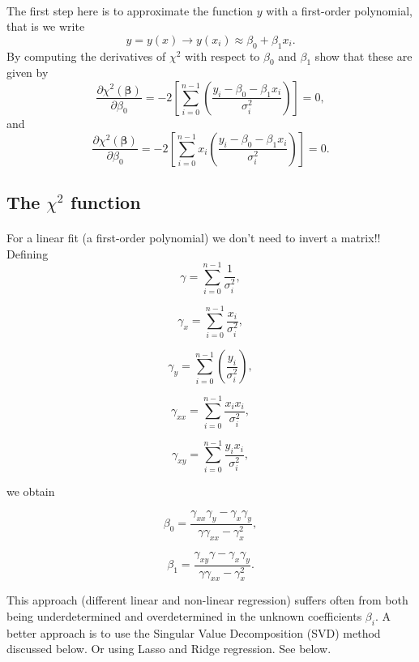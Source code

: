 \documentclass[%
oneside,                 %
final,                   %
10pt]{article}
\begin{document}
\paragraph{}
The first step here is to approximate the function $y$ with a first-order polynomial, that is we write
\[
y=y(x) \rightarrow y(x_i) \approx \beta_0+\beta_1 x_i.
\]
By computing the derivatives of $\chi^2$ with respect to $\beta_0$ and $\beta_1$ show that these are given by
\[
\frac{\partial \chi^2(\bm{\beta})}{\partial \beta_0} = -2\left[ \sum_{i=0}^{n-1}\left(\frac{y_i-\beta_0-\beta_1x_{i}}{\sigma_i^2}\right)\right]=0,
\]
and
\[
\frac{\partial \chi^2(\bm{\beta})}{\partial \beta_0} = -2\left[ \sum_{i=0}^{n-1}x_i\left(\frac{y_i-\beta_0-\beta_1x_{i}}{\sigma_i^2}\right)\right]=0.
\]



\subsection{The $\chi^2$ function}

\paragraph{}

For a linear fit (a first-order polynomial) we don't need to invert a matrix!!  
Defining
\[
\gamma =  \sum_{i=0}^{n-1}\frac{1}{\sigma_i^2},
\]

\[
\gamma_x =  \sum_{i=0}^{n-1}\frac{x_{i}}{\sigma_i^2},
\]

\[
\gamma_y = \sum_{i=0}^{n-1}\left(\frac{y_i}{\sigma_i^2}\right),
\]

\[
\gamma_{xx} =  \sum_{i=0}^{n-1}\frac{x_ix_{i}}{\sigma_i^2},
\]

\[
\gamma_{xy} = \sum_{i=0}^{n-1}\frac{y_ix_{i}}{\sigma_i^2},
\]

we obtain

\[
\beta_0 = \frac{\gamma_{xx}\gamma_y-\gamma_x\gamma_y}{\gamma\gamma_{xx}-\gamma_x^2},
\]

\[
\beta_1 = \frac{\gamma_{xy}\gamma-\gamma_x\gamma_y}{\gamma\gamma_{xx}-\gamma_x^2}.
\]

This approach (different linear and non-linear regression) suffers
often from both being underdetermined and overdetermined in the
unknown coefficients $\beta_i$.  A better approach is to use the
Singular Value Decomposition (SVD) method discussed below. Or using
Lasso and Ridge regression. See below.
\end{document}

